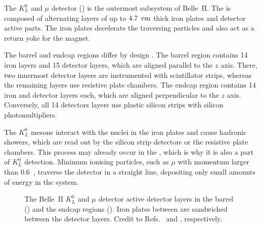 The $K_L^0$ and $\mu$ detector (\KLM) \cite{Aushev:2014spa} is the outermost subsystem of Belle~II.
The \KLM is composed of alternating layers of up to $4.7~{\rm \,cm}$ thick iron plates and detector active parts.
The iron plates decelerate the traversing particles and also act as a return yoke for the magnet.

The barrel and endcap regions differ by design \cite{Krohn:317929}.
The barrel region contains 14 iron layers and 15 detector layers, which are aligned parallel to the $z$ axis.
There, two innermost detector layers are instrumented with scintillator strips, 
whereas the remaining layers use resistive plate chambers.
The endcap region contains 14 iron and detector layers each, which are aligned perpendicular to the $z$ axis.
Conversely, all 14 detectors layers use plastic silicon strips with silicon photomultipliers.

The $K_L^0$ mesons interact with the nuclei in the iron plates and cause hadronic showers, 
which are read out by the silicon strip detectors or the resistive plate chambers.
This process may already occur in the \ECL, which is why it is also a part of $K_L^0$ detection.
Minimum ionising particles, such as $\mu$ with momentum larger than 0.6~\gevc, traverse the detector in a straight line, 
depositing only small amounts of energy in the system.

\begin{figure}[htbp!]
    \caption{\label{fig:klm}
        The Belle~II $K_L^0$ and $\mu$ detector active detector layers in the barrel () and the endcap regions ().
        Iron plates between are sandwiched between the detector layers.
        Credit to Refs.~\cite{Krohn:317929} and \cite{Aushev:2014spa}, respectively.
    }
\end{figure}

